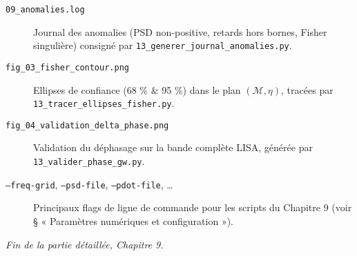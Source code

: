 \begin{description}
  \item[\texttt{09\_anomalies.log}]  
    Journal des anomalies (PSD non‐positive, retards hors bornes, Fisher singulière) consigné par \texttt{13\_generer\_journal\_anomalies.py}.

  \item[\texttt{fig\_03\_fisher\_contour.png}]  
    Ellipses de confiance (68 \% & 95 \%) dans le plan $(\mathcal{M},\eta)$, tracées par \texttt{13\_tracer\_ellipses\_fisher.py}.

  \item[\texttt{fig\_04\_validation\_delta\_phase.png}]  
    Validation du déphasage sur la bande complète LISA, générée par \texttt{13\_valider\_phase\_gw.py}.

  \item[\texttt{--freq-grid}, \texttt{--psd-file}, \texttt{--pdot-file}, …]  
    Principaux flags de ligne de commande pour les scripts du Chapitre 9 (voir § « Paramètres numériques et configuration »).
\end{description}


\bigskip
\noindent\emph{Fin de la partie détaillée, Chapitre 9.}